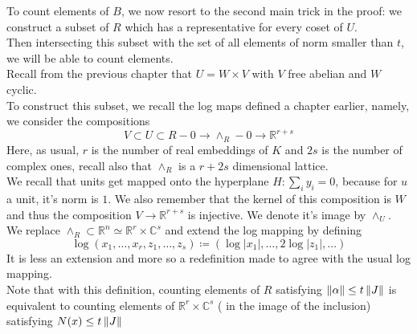 \documentclass[../main.tex]{subfiles}
\begin{document}
To count elements of $B$, we now resort to the second main trick in the proof: we construct a subset of $R$ which has a representative for every coset of $U$.\\
Then intersecting this subset with the set of all elements of norm smaller than $t$, we will be able to count elements.\\
Recall from the previous chapter that $U = W\times V$ with $V$ free abelian and $W$ cyclic.\\
To construct this subset, we recall the log maps defined a chapter earlier, namely, we consider the compositions
\[ 
V \subset U \subset R- 0 \to \wedge_R - 0 \to \mathbb{R}^{r+s}
\]
Here, as usual, $r$ is the number of real embeddings of $K$ and $2s$ is the number of complex ones, recall also that $\wedge_R$ is a $r+2s$ dimensional lattice.\\
We recall that units get mapped onto the hyperplane $H: \sum_i y_i =0$, because for $u$  a unit, it's norm is $1$. We also remember that the kernel of this composition is $W$ and thus the composition $V \to \mathbb{R}^{r+s}$ is injective. We denote it's image by $\wedge_U$.\\
We replace $\wedge_R \subset \mathbb{R}^{n} \simeq \mathbb{R}^{r}\times \mathbb{C}^{s}$ and extend the log mapping by defining 
\[ 
\log ( x_1,\ldots,x_r, z_1,\ldots,z_s) \coloneqq ( \log |x_1|, \ldots, 2 \log |z_1| ,\ldots) 
\]
It is less an extension and more so a redefinition made to agree with the usual log mapping.\\
Note that with this definition, counting elements of $R$ satisfying $ \left\lVert\alpha\right\rVert \leq t \left\lVert J\right\rVert$ is equivalent to counting elements of $ \mathbb{R}^{r}\times \mathbb{C}^{s}$ ( in the image of the inclusion) satisfying $N( x) \leq t \left\lVert J\right\rVert$ 
\end{document}
